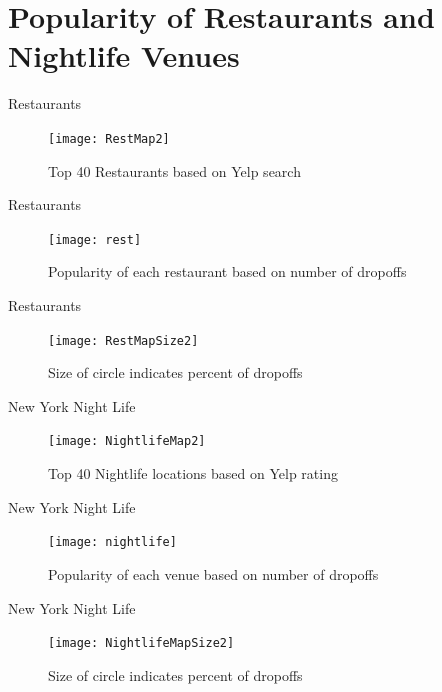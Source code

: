 \documentclass[11pt,tightenlines,nofootinbib,superscriptaddress,notitlepage, APS, pra]{beamer}
\theoremstyle{definition}
\theoremstyle{plain}
\begin{document}
\section{Popularity of Restaurants and Nightlife Venues}

\begin{frame}{Restaurants}
\begin{figure}
\centering
\texttt{[image: RestMap2]}
\caption{Top 40 Restaurants based on Yelp search}
\end{figure}
\end{frame}

\begin{frame}{Restaurants}
\begin{figure}
\centering
\texttt{[image: rest]}
\caption{Popularity of each restaurant based on number of dropoffs }
\end{figure}
\end{frame}

\begin{frame}{Restaurants}
\begin{figure}
\centering
\texttt{[image: RestMapSize2]}
\caption{Size of circle indicates percent of dropoffs}
\end{figure}
\end{frame}


\begin{frame}{New York Night Life}
\begin{figure}
\centering
\texttt{[image: NightlifeMap2]}
\caption{Top 40 Nightlife locations based on Yelp rating}
\end{figure}
\end{frame}

\begin{frame}{New York Night Life}
\begin{figure}
\centering
\texttt{[image: nightlife]}
\caption{Popularity of each venue based on number of dropoffs} 
\end{figure}
\end{frame}

\begin{frame}{New York Night Life}
\begin{figure}
\centering 
\texttt{[image: NightlifeMapSize2]}
\caption{Size of circle indicates percent of dropoffs} 
\end{figure}
\end{frame}
\end{document}
